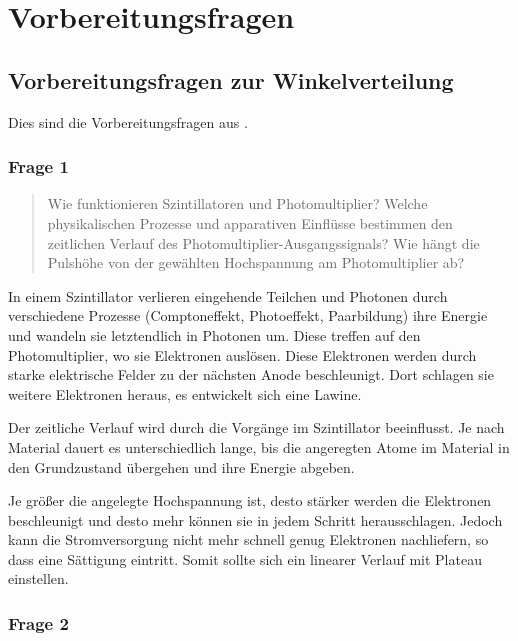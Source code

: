 \documentclass[11pt, ngerman, fleqn, DIV=15, headinclude, BCOR=2cm]{scrreprt}
\begin{document}
\section{Vorbereitungsfragen}

\subsection{Vorbereitungsfragen zur Winkelverteilung}

Dies sind die Vorbereitungsfragen aus \parencite[11]{physik512-Anleitung}.

\subsubsection{Frage 1}
\label{sec:frage1-1}

\begin{quote}
    Wie funktionieren Szintillatoren und Photomultiplier? Welche
    physikalischen Prozesse und apparativen Einflüsse bestimmen den
    zeitlichen Verlauf des Photomultiplier-Ausgangssignals? Wie hängt die
    Pulshöhe von der gewählten Hochspannung am Photomultiplier ab?
\end{quote}

In einem Szintillator verlieren eingehende Teilchen und Photonen durch
verschiedene Prozesse (Comptoneffekt, Photoeffekt, Paarbildung) ihre Energie
und wandeln sie letztendlich in Photonen um. Diese treffen auf den
Photomultiplier, wo sie Elektronen auslösen. Diese Elektronen werden durch
starke elektrische Felder zu der nächsten Anode beschleunigt. Dort schlagen sie
weitere Elektronen heraus, es entwickelt sich eine Lawine.

Der zeitliche Verlauf wird durch die Vorgänge im Szintillator beeinflusst. Je
nach Material dauert es unterschiedlich lange, bis die angeregten Atome im
Material in den Grundzustand übergehen und ihre Energie abgeben.


Je größer die angelegte Hochspannung ist, desto stärker werden die Elektronen
beschleunigt und desto mehr können sie in jedem Schritt herausschlagen. Jedoch
kann die Stromversorgung nicht mehr schnell genug Elektronen nachliefern, so
dass eine Sättigung eintritt. Somit sollte sich ein linearer Verlauf mit
Plateau einstellen.

\subsubsection{Frage 2}
\end{document}
